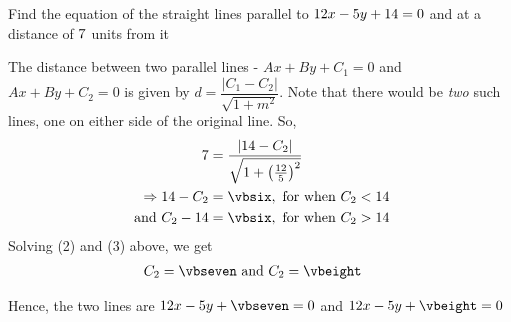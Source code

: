 \question[3] Find the equation of the straight lines parallel to $12 x - 5 y + 14 = 0$ 
and at a distance of $7$ units from it


\watchout

\ifprintanswers
\fi 

\begin{solution}[\halfpage]
	The distance between two parallel lines - $Ax + By + C_1 = 0$ and $Ax+By+C_2 = 0$ is given by 
	$d = \dfrac{\vert C_1 - C_2 \vert}{\sqrt{1 + m^2}}$. Note that there would be \textit{two} such lines, 
	one on either side of the original line. So,
	\begin{align}
		\vbfour &= \dfrac{\vert \vbthree - C_2 \vert}{\sqrt{1 + \left( \frac{\vbone}{\vbtwo}\right)^2}} \\
		\Rightarrow \vbthree - C_2 &= \vbsix, \text{ for when } C_2 < \vbthree \\
		\text{ and } C_2 - \vbthree &= \vbsix, \text{ for when } C_2 > \vbthree
	\end{align}
	Solving (2) and (3) above, we get 
	\begin{align}
		C_2 &= \vbseven \text{ and } C_2 = \vbeight
	\end{align}
	
	Hence, the two lines are $\vbone x - \vbtwo y + \vbseven = 0$ and $\vbone x - \vbtwo y + \vbeight = 0$
\end{solution}

